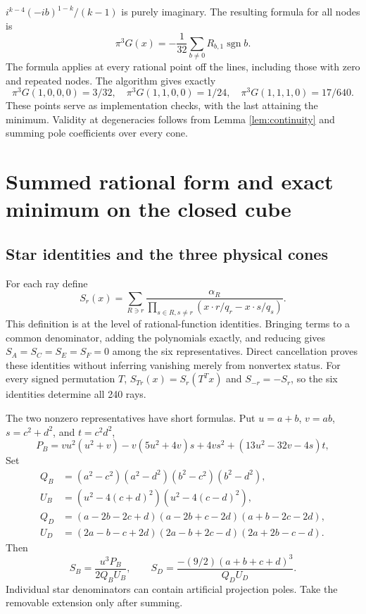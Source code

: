\documentclass[11pt,a4paper]{article}
\theoremstyle{remark}\newtheorem{remark}[theorem]{Remark}
\newcommand{\1}{\mathbf1}\newcommand{\pos}[1]{(#1)_+}
\DeclareMathOperator{\sgn}{sgn}\DeclareMathOperator{\rank}{rank}
\begin{document}
$i^{k-4}(-ib)^{1-k}/(k-1)$ is purely imaginary. The resulting formula for all nodes is
\begin{equation}\label{eq:allnodes}
 \pi^3G(x)=-\frac1{32}\sum_{b\ne0}R_{b,1}\sgn b.
\end{equation}
The formula applies at every rational point off the lines, including those with zero and repeated nodes. The algorithm gives exactly
\begin{equation}\label{eq:anchors}
 \pi^3G(1,0,0,0)=3/32,\quad
 \pi^3G(1,1,0,0)=1/24,\quad
 \pi^3G(1,1,1,0)=17/640.
\end{equation}
These points serve as implementation checks, with the last attaining the minimum. Validity at degeneracies follows from Lemma \ref{lem:continuity} and summing pole coefficients over every cone.

\section{Summed rational form and exact minimum on the closed cube}
\subsection{Star identities and the three physical cones}
For each ray define
\[
 S_r(x)=\sum_{R\ni r}\frac{\alpha_R}
 {\prod_{s\in R,s\ne r}(x\cdot r/q_r-x\cdot s/q_s)}.
\]
This definition is at the level of rational-function identities. Bringing terms to a common denominator, adding the polynomials exactly, and reducing gives $S_A=S_C=S_E=S_F=0$ among the six representatives. Direct cancellation proves these identities without inferring vanishing merely from nonvertex status. For every signed permutation $T$, $S_{Tr}(x)=S_r(T^Tx)$ and $S_{-r}=-S_r$, so the six identities determine all 240 rays.

The two nonzero representatives have short formulas. Put $u=a+b$, $v=ab$, $s=c^2+d^2$, and $t=c^2d^2$,
\[
 P_B=vu^2(u^2+v)-v(5u^2+4v)s+4vs^2+(13u^2-32v-4s)t,
\]
Set
\begin{align*}
 Q_B&=(a^2-c^2)(a^2-d^2)(b^2-c^2)(b^2-d^2),\\
 U_B&=(u^2-4(c+d)^2)(u^2-4(c-d)^2),\\
 Q_D&=(a-2b-2c+d)(a-2b+c-2d)(a+b-2c-2d),\\
 U_D&=(2a-b-c+2d)(2a-b+2c-d)(2a+2b-c-d).
\end{align*}
Then
\[
 S_B=\frac{u^3P_B}{2Q_BU_B},\qquad
 S_D=\frac{-(9/2)(a+b+c+d)^3}{Q_DU_D}.
\]
Individual star denominators can contain artificial projection poles. Take the removable extension only after summing.
\end{document}

